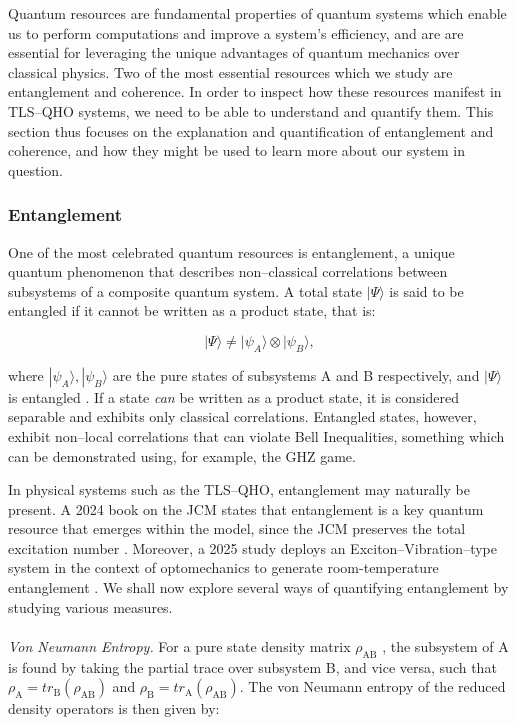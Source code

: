 \documentclass[11pt]{article}
\begin{document}
Quantum resources are fundamental properties of quantum systems which enable us to perform computations and improve a system's efficiency, and are are essential for leveraging the unique advantages of quantum mechanics over classical physics. Two of the most essential resources which we study are entanglement and coherence. In order to inspect how these resources manifest in TLS--QHO systems, we need to be able to understand and quantify them. This section thus focuses on the explanation and quantification of entanglement and coherence, and how they might be used to learn more about our system in question. 

\subsubsection{Entanglement}

One of the most celebrated quantum resources is entanglement, a unique quantum phenomenon that describes non--classical correlations between subsystems of a composite quantum system. A total state $|\Psi\rangle$ is said to be entangled if it cannot be written as a product state, that is:

\begin{equation}
    |\Psi\rangle \neq |\psi_A\rangle \otimes |\psi_B\rangle,
\end{equation}

where $|\psi_A\rangle, |\psi_B\rangle$ are the pure states of subsystems A and B respectively, and $|\Psi\rangle$ is entangled \cite{Entanglement1999-Overview_&REE}. If a state \textit{can} be written as a product state, it is considered separable and exhibits only classical correlations. Entangled states, however, exhibit non--local correlations that can violate Bell Inequalities, something which can be demonstrated using, for example, the GHZ game. 

In physical systems such as the TLS--QHO, entanglement may  naturally be present. A 2024 book on the JCM states that entanglement is a key quantum resource that emerges within the model, since the JCM preserves the total excitation number \cite{General2024-JC_overview}. Moreover, a 2025 study deploys an Exciton--Vibration--type system in the context of optomechanics to generate room-temperature entanglement \cite{Entanglement2025-ExVib_roomtemp}. We shall now explore several ways of quantifying entanglement by studying various measures. \\
\\
\textit{Von Neumann Entropy.} For a pure state density matrix $\rho_{\scriptscriptstyle \text{AB}}$ \cite{Entanglement1999-Overview_&REE}, the subsystem of A is  found by taking the partial trace over subsystem B, and vice versa, such that $\rho_{\scriptscriptstyle \text{A}} = tr_{\scriptscriptstyle \text{B}}(\rho_{\scriptscriptstyle \text{AB}})$ and $\rho_{\scriptscriptstyle \text{B}} = tr_{\scriptscriptstyle \text{A}}(\rho_{\scriptscriptstyle \text{AB}})$. The von Neumann entropy of the reduced density operators is then given by:
\end{document}
